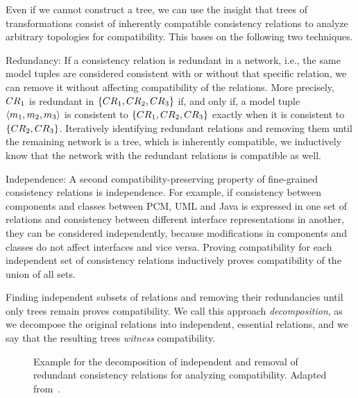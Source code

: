 Even if we cannot construct a tree, we can use the insight that trees of transformations consist of inherently compatible consistency relations to analyze arbitrary topologies for compatibility.
This bases on the following two techniques.
\begin{properdescription}
    \item[Redundancy:] If a consistency relation is redundant in a network, i.e., the same model tuples are considered consistent with or without that specific relation, we can remove it without affecting compatibility of the relations. More precisely, $\consistencyrelation{CR}{1}$ is redundant in $\setted{\consistencyrelation{CR}{1}, \consistencyrelation{CR}{2}, \consistencyrelation{CR}{3}}$ if, and only if, a model tuple $\tupled{\model{m}{1}, \model{m}{2}, \model{m}{3}}$ is consistent to $\setted{\consistencyrelation{CR}{1}, \consistencyrelation{CR}{2}, \consistencyrelation{CR}{3}}$ exactly when it is consistent to $\setted{\consistencyrelation{CR}{2}, \consistencyrelation{CR}{3}}$.
    Iteratively identifying redundant relations and removing them until the remaining network is a tree, which is inherently compatible, we inductively know that the network with the redundant relations is compatible as well.
    \item[Independence:] A second compatibility-preserving property of fine-grained consistency relations is independence.
    For example, if consistency between components and classes between \gls{PCM}, \gls{UML} and Java is expressed in one set of relations and consistency between different interface representations in another, they can be considered independently, because modifications in components and classes do not affect interfaces and vice versa.
    Proving compatibility for each independent set of consistency relations inductively proves compatibility of the union of all sets.
\end{properdescription}

Finding independent subsets of relations and removing their redundancies until only trees remain proves compatibility.
We call this approach \emph{decomposition}, as we decompose the original relations into independent, essential relations, and we say that the resulting trees \emph{witness} compatibility.

\begin{figure}
    \centering
    
    \caption[Exemplary overview of compatibility analysis idea]{Example for the decomposition of independent and removal of redundant consistency relations for analyzing compatibility. Adapted from~.}
    \label{fig:compatibility:decomposition}
\end{figure}

